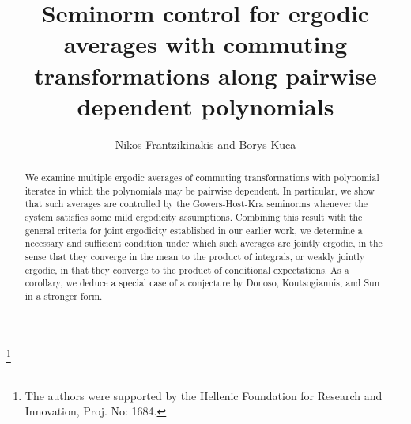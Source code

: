 \documentclass[11pt]{amsart}
\theoremstyle{definition}
\begin{document}
	
	
	
		\title[]{Seminorm control for ergodic averages	with commuting transformations along pairwise dependent polynomials}
		
	\thanks{The authors were supported  by the Hellenic Foundation for Research and Innovation, Proj. No: 1684.}

\author{Nikos Frantzikinakis and Borys Kuca}
\address[Nikos Frantzikinakis]{University of Crete, Department of mathematics and applied mathematics, Voutes University Campus, Heraklion 71003, Greece} 

\address[Borys Kuca]{University of Crete, Department of mathematics and applied mathematics, Voutes University Campus, Heraklion 71003, Greece}



	
	
	
	\maketitle

	
\begin{abstract}
   We examine multiple ergodic averages of commuting transformations with polynomial iterates in which the polynomials may be pairwise dependent. In particular, we show that such averages are controlled by the  Gowers-Host-Kra seminorms whenever the system satisfies some mild ergodicity assumptions. Combining this result with the general criteria for joint ergodicity established in our earlier work, we determine a necessary and sufficient condition under which such averages are jointly ergodic, in the sense that they converge in the mean to the product of integrals, or weakly jointly ergodic, in that they converge to the product of conditional expectations. As a corollary, we deduce a special case of a conjecture by Donoso, Koutsogiannis, and Sun in a stronger form.
\end{abstract}
\end{document}
